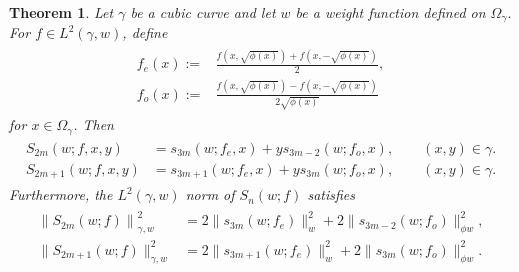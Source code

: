 \documentclass{amsart}
\newtheorem{thm}{Theorem}[section]
\theoremstyle{remark}
\def\g{{\gamma}}
\begin{document}
\begin{thm}
Let $\g$ be a cubic curve and let $w$ be a weight function defined on $\Omega_\g$. For $f \in 
L^2(\g,w)$, define 
\begin{align} \label{eq:fe-fo}
\begin{split}
  f_e(x):= & \frac{f\left(x, \sqrt{\phi(x)}\right)+ f\left(x, - \sqrt{\phi(x)}\right)}{2}, \\
  f_o(x):= & \frac{f\left(x, \sqrt{\phi(x)}\right)- f\left(x, - \sqrt{\phi(x)}\right)}{2 \sqrt{\phi(x)}}
\end{split}
\end{align}
for $x \in \Omega_\g$. Then
\begin{align*}
\begin{split}
  S_{2m} (w; f, x, y) &= s_{3m} (w; f_e, x) + y s_{3m-2} (w; f_o, x), \qquad (x,y) \in \g. \\
  S_{2m+1} (w; f, x, y) & = s_{3m+1} (w; f_e, x) + y s_{3m} (w; f_o, x), \qquad (x,y) \in \g.
\end{split}
\end{align*}
Furthermore, the $L^2(\g,w)$ norm of $S_n(w;f)$ satisfies
\begin{align}\label{eq:norm-partialsum}
\begin{split}
  \left \|S_{2m}(w; f)\right \|_{\g,w}^2 & = 2 \|s_{3m} (w; f_e) \|_{w}^2 +2 \| s_{3m-2} (w; f_o)\|_{\phi w}^2, \\
  \|S_{2m+1}(w; f)\|_{\g,w}^2 & = 2 \|s_{3m+1} (w; f_e) \|_{w}^2 +2 \| s_{3m} (w; f_o)\|_{\phi w}^2. 
\end{split}
\end{align}
\end{thm}
\end{document}
